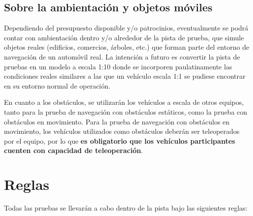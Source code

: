 \documentclass[letterpaper,12pt]{article}
\begin{document}
\subsection{Sobre la ambientación y objetos móviles}
Dependiendo del presupuesto disponible y/o patrocinios, eventualmente se podrá contar con ambientación dentro y/o alrededor de la pista de prueba, que simule objetos reales (edificios, comercios, árboles, etc.) que forman parte del entorno de navegación de un automóvil real. La intención a futuro es convertir la pista de pruebas en un modelo a escala 1:10 donde se incorporen paulatinamente las condiciones reales similares a las que un vehículo escala 1:1 se pudiese encontrar en su entorno normal de operación.

En cuanto a los obstáculos, se utilizarán los vehículos a escala de otros equipos, tanto para la prueba de navegación con obstáculos estáticos, como la prueba con obstáculos en movimiento. Para la prueba de navegación con obstáculos en movimiento, los vehículos utilizados como obstáculos deberán ser teleoperados por el equipo, por lo que \textbf{es obligatorio que los vehículos participantes cuenten con capacidad de teleoperación}. 

\section{Reglas}

Todas las pruebas se llevarán a cabo dentro de la pista bajo las siguientes reglas:
\end{document}
